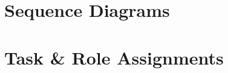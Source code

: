 \documentclass[11pt]{scrartcl}
\let\stdsection\section
\renewcommand\section{\newpage\stdsection}
\begin{document}

        
        
\section{Sequence Diagrams}

\appendix


\clearpage
\section{Task \& Role Assignments}
\end{document}

